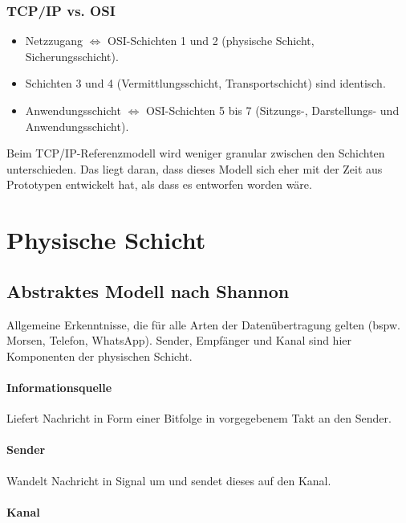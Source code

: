 \documentclass[a4paper, 14pt]{article}
\begin{document}
	\subsubsection{TCP/IP vs. OSI}

	\begin{itemize}
		\item Netzzugang $\Leftrightarrow$ OSI-Schichten 1 und 2 (physische Schicht, Sicherungsschicht).
		\item Schichten 3 und 4 (Vermittlungsschicht, Transportschicht) sind identisch.
		\item Anwendungsschicht $\Leftrightarrow$ OSI-Schichten 5 bis 7 (Sitzungs-, Darstellungs- und Anwendungsschicht).
	\end{itemize}

	Beim TCP/IP-Referenzmodell wird weniger granular zwischen den Schichten unterschieden.
	Das liegt daran, dass dieses Modell sich eher mit der Zeit aus Prototypen entwickelt hat, als dass es entworfen worden wäre.

	\section{Physische Schicht}

	\subsection{Abstraktes Modell nach Shannon}
	\label{sec:shannon}

	Allgemeine Erkenntnisse, die für alle Arten der Datenübertragung gelten (bspw. Morsen, Telefon, WhatsApp).
	Sender, Empfänger und Kanal sind hier Komponenten der physischen Schicht.

	\paragraph{Informationsquelle}

	Liefert Nachricht in Form einer Bitfolge in vorgegebenem Takt an den Sender.

	\paragraph{Sender}

	Wandelt Nachricht in Signal um und sendet dieses auf den Kanal.

	\paragraph{Kanal}
\end{document}
